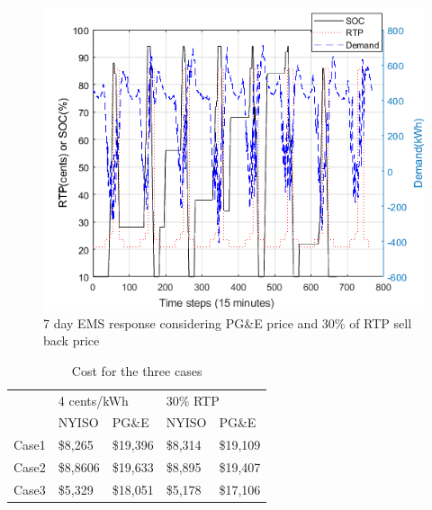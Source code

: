  \begin{figure}[!ht]
    \centering
    \includegraphics[width = \linewidth]{figs/PG_VAR_10_12_30rtp.png}
    \caption{7 day EMS response considering PG\&E price and 30\% of RTP sell back price}
    \label{fig:PG_VAR_10_12_30rtp}
\end{figure}


\begin{table}[htb]
\normalsize
\renewcommand{\arraystretch}{1}
\caption{Cost for the three cases}
\label{tab:Cost}
\centering

\begin{tabular}{l|l|l|l|l|}
\cline{2-5}
                            & \multicolumn{2}{l|}{4 cents/kWh} & \multicolumn{2}{l|}{30\% RTP}   \\ \cline{2-5} 
                            & NYISO           & PG\&E          & NYISO          & PG\&E          \\ \hline
\multicolumn{1}{|l|}{Case1} & \$8,265  & \$19,396 & \$8,314 & \$19,109 \\ \hline
\multicolumn{1}{|l|}{Case2} & \$8,8606  & \$19,633 & \$8,895 & \$19,407 \\ \hline
\multicolumn{1}{|l|}{Case3} & \$5,329  & \$18,051 & \$5,178 & \$17,106 \\ \hline
\end{tabular}

\end{table}




